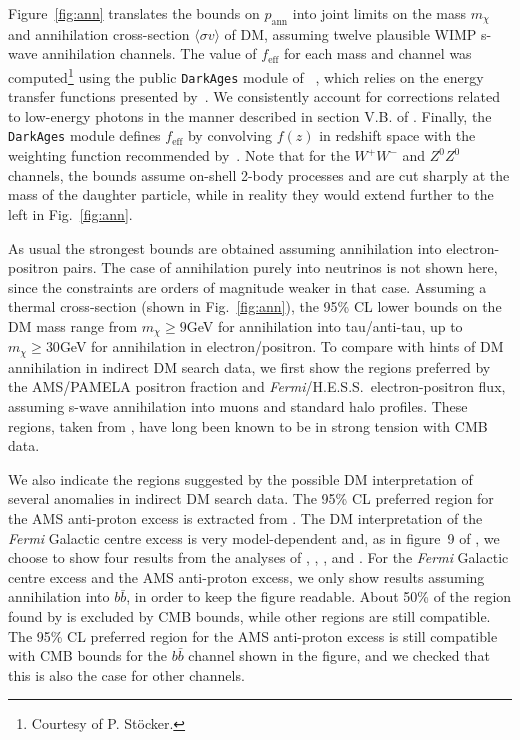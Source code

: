 \documentclass[longauth,traditabstract]{aa}
\def\,{\thinspace}
\begin{document}
Figure~\ref{fig:ann} translates the bounds on $p_\mathrm{ann}$ into joint limits on the mass $m_\chi$ and annihilation cross-section $\langle \sigma v \rangle$ of DM, assuming twelve plausible WIMP s-wave annihilation channels. The value of $f_\mathrm{eff}$ for each mass and channel was computed\footnote{Courtesy of P. St\"ocker.} using the public {\tt DarkAges} module of~ \cite{Stocker:2018avm}, which relies on the energy transfer functions presented by~\cite{Slatyer:2015kla}. We consistently account for corrections related to low-energy photons in the manner described in section V.B. of \cite{Slatyer:2015kla}. Finally, the {\tt DarkAges} module defines $f_\mathrm{eff}$ by convolving $f(z)$ in redshift space with the weighting function recommended by~\cite{Slatyer:2015jla}.
Note that for the $W^+W^-$ and $Z^0Z^0$ channels, the bounds assume on-shell 2-body processes and are cut sharply at the mass of the daughter particle, while in reality they would extend further to the left in Fig.~\ref{fig:ann}.

As usual the strongest bounds are obtained assuming annihilation into electron-positron pairs. The case of annihilation purely into neutrinos is not shown here, since the constraints are orders of magnitude weaker in that case. Assuming a thermal cross-section (shown in Fig.~\ref{fig:ann}), the 95\,\% CL lower bounds on the DM mass range from $m_\chi \geq 9$\,GeV for annihilation into tau/anti-tau, up to $m_\chi \geq 30$\,GeV for annihilation in electron/positron.
To compare with hints of DM annihilation in indirect DM search data, we first show the regions preferred by the AMS/PAMELA positron fraction and {\it Fermi}/H.E.S.S.\ electron-positron flux, assuming s-wave annihilation into muons and standard halo profiles. These regions, taken from \citet{Cirelli:2008pk}, have long been known to be in strong tension with CMB data.

We also indicate the regions suggested by the possible DM interpretation of several anomalies in indirect DM search data. The 95\,\% CL preferred region for the AMS anti-proton excess is extracted from \cite{Cuoco:2016eej,Cuoco:2017rxb}. The DM interpretation of the {\it Fermi\/} Galactic centre excess is very model-dependent and, as in figure~9 of \citet{Charles:2016pgz}, we choose to show four results from the analyses of \citet{Gordon:2013vta}, \citet{Abazajian:2014fta}, \citet{Calore:2014nla}, and \citet{Daylan:2014rsa}. For the {\it Fermi\/} Galactic centre excess and the AMS anti-proton excess, we only show results assuming annihilation into $b\bar{b}$, in order to keep the figure readable. About 50\,\% of the region found by \cite{Abazajian:2014fta} is excluded by CMB bounds, while other regions are still compatible. The 95\,\% CL preferred region for the AMS anti-proton excess is still compatible with CMB bounds for the $b\bar{b}$ channel shown in the figure, and we checked that this is also the case for other channels.
\end{document}
